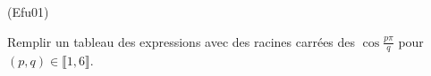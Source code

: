 \begin{tiny}(Efu01)\end{tiny} Remplir un tableau des expressions avec des racines carrées des $\cos\frac{p\pi}{q}$ pour $(p,q)\in \llbracket 1,6\rrbracket$.